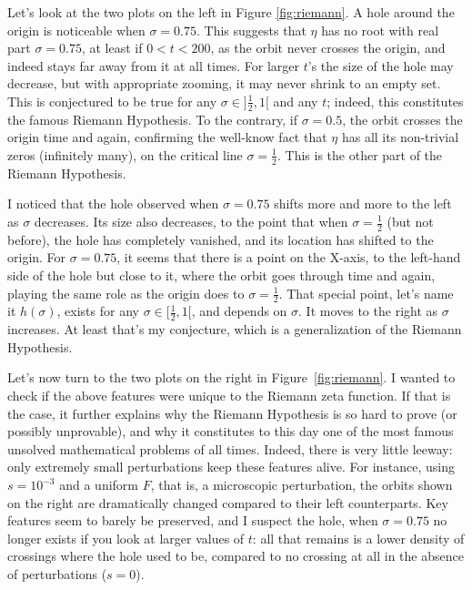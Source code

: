 \documentclass[10pt]{article}
\begin{document}
Let's look at the two plots on the left in Figure \ref{fig:riemann}. A hole around the origin is noticeable when $\sigma=0.75$. This suggests that $\eta$ has no root with real part $\sigma=0.75$, at least if $0<t<200$, as the orbit never crosses the origin, and indeed stays far away from it at all times. For larger $t$'s the size of the hole may decrease, but with appropriate zooming, it may never shrink to an empty set. This is conjectured to be true for any $\sigma\in ]\frac{1}{2}, 1[$ and any $t$; indeed, this constitutes the famous \textcolor{index}{Riemann Hypothesis}. To the contrary, if $\sigma=0.5$, the orbit crosses the origin time and again, confirming the well-know fact that $\eta$ has all its non-trivial zeros (infinitely many), on the critical line $\sigma=\frac{1}{2}$. This is the other part of the Riemann Hypothesis. 

I noticed that the hole observed when $\sigma=0.75$ shifts more and more to the left as $\sigma$ decreases. Its size also decreases, to the point that when $\sigma=\frac{1}{2}$ (but not before), the hole has completely vanished, and its location has shifted to the origin. For $\sigma=0.75$, it seems that there is a point on the X-axis, to the left-hand side of the hole but close to it, where the orbit goes through time and again, playing the same role as the origin does to $\sigma=\frac{1}{2}$. That special point, let's name it $h(\sigma)$, exists for any $\sigma\in[\frac{1}{2},1[$, and depends on $\sigma$. It moves to the right as $\sigma$ increases. At least that's my conjecture, which is a generalization of the Riemann Hypothesis.

Let's now turn to the two plots on the right in Figure~\ref{fig:riemann}. I wanted to check if the above features were unique to the Riemann zeta function. If that is the case, it further explains why the Riemann Hypothesis is so hard to prove (or possibly unprovable), and why it constitutes to this day one of the most famous unsolved mathematical problems of all times. Indeed, there is very little leeway: only extremely small perturbations keep these features alive. For instance, using $s=10^{-3}$ and a uniform $F$, that is, a microscopic perturbation, the orbits shown on the right are dramatically changed compared to their left counterparts. Key features seem to barely be preserved, and I suspect the hole, when $\sigma=0.75$ no longer exists if you look at larger values of $t$: all that remains is a lower density of crossings where the hole used to be, compared to no crossing at all in the absence of perturbations ($s=0$). 
\end{document}
